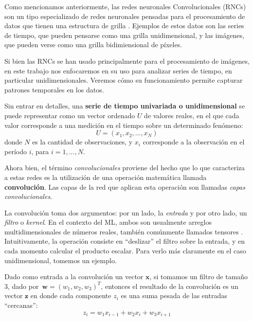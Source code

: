 \documentclass[../../main.tex]{subfiles}
\begin{document}
Como mencionamos anteriormente, las redes neuronales Convolucionales (RNCs) son un tipo
especializado de redes neuronales pensadas para el procesamiento de datos que tienen una
estructura de grilla \cite{deep-learning}. Ejemplos de estos datos son las series de
tiempo, que pueden pensarse como una grilla unidimensional, y las imágenes, que pueden
verse como una grilla bidimiensional de píxeles.

Si bien las RNCs se han usado principalmente para el procesamiento de imágenes, en este
trabajo nos enfocaremos en su uso para analizar series de tiempo, en particular
unidimensionales. Veremos cómo su funcionamiento permite capturar patrones temporales en
los datos.

Sin entrar en detalles, una \textbf{serie de tiempo univariada o
unidimensional} se puede representar como un vector ordenado \(U\) de valores reales, en
el que cada valor corresponde a una medición en el tiempo sobre un determinado fenómeno:
\[
    U = (x_1, x_2, ..., x_N)
\]
donde \(N\) es la cantidad de observaciones, y \(x_i\) corresponde a la observación
en el período \(i\), para \(i = 1,...,N\).

Ahora bien, el término \textit{convolucionales} proviene del hecho que lo que caracteriza
a estas redes es la utilización de una operación matemática llamada
\textbf{convolución}\footnotemark \cite{deep-learning}. Las capas de la red que aplican
esta operación son llamadas \textit{capas convolucionales}. 

La convolución toma dos argumentos: por un lado, la \textit{entrada} y por otro lado, un
\textit{filtro} o \textit{kernel}. En el contexto del ML, ambos son usualmente arreglos
multidimensionales de números reales, también comúnmente llamados tensores
\cite{deep-learning}. Intuitivamente, la operación consiste en ``deslizar'' el filtro
sobre la entrada, y en cada momento calcular el producto escalar. Para verlo más
claramente en el caso unidimensional, tomemos un ejemplo.

Dado como entrada a la convolución un vector \(\bm{x}\), si tomamos un filtro de
tamaño 3, dado por\footnotemark\ \(\bm{w}=(w_1, w_2, w_3)^T\), entonces el resultado de la convolución
es un vector \(\bm{z}\) en donde cada componente \(z_i\) es una suma pesada de las
entradas ``cercanas'':
\[z_i = w_1 x_{i-1} + w_2 x_{i} + w_3 x_{i+1}\]
\end{document}
